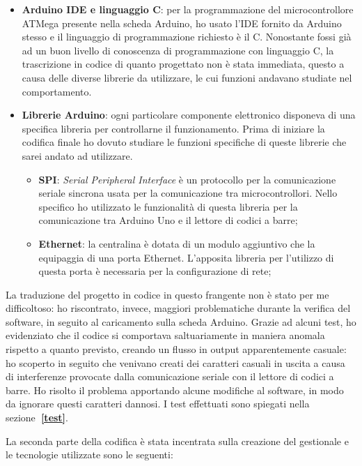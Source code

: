 \begin{itemize}
\item \textbf{Arduino IDE e linguaggio C}: per la programmazione del microcontrollore ATMega presente nella scheda Arduino, ho usato l'IDE fornito da Arduino stesso e il linguaggio di programmazione richiesto è il C. Nonostante fossi già ad un buon livello di conoscenza di programmazione con linguaggio C, la trascrizione in codice di quanto progettato non è stata immediata, questo a causa delle diverse librerie da utilizzare, le cui funzioni andavano studiate nel comportamento.
\item \textbf{Librerie Arduino}: ogni particolare componente elettronico disponeva di una specifica libreria per controllarne il funzionamento. Prima di iniziare la codifica finale ho dovuto studiare le funzioni specifiche di queste librerie che sarei andato ad utilizzare.
\begin{itemize}
	\item \textbf{SPI}: \textit{Serial Peripheral Interface} è un protocollo per la comunicazione seriale sincrona usata per la comunicazione tra microcontrollori. Nello specifico ho utilizzato le funzionalità di questa libreria per la comunicazione tra Arduino Uno e il lettore di codici a barre;
	\item \textbf{Ethernet}: la centralina è dotata di un modulo aggiuntivo che la equipaggia di una porta Ethernet. L'apposita libreria per l'utilizzo di questa porta è necessaria per la configurazione di rete;
	
\end{itemize}
\end{itemize}

La traduzione del progetto in codice in questo frangente non è stato per me difficoltoso: ho riscontrato, invece, maggiori problematiche durante la verifica del software, in seguito al caricamento sulla scheda Arduino. Grazie ad alcuni test, ho evidenziato che il codice si comportava saltuariamente in maniera anomala rispetto a quanto previsto, creando un flusso in output apparentemente casuale: ho scoperto in seguito che venivano creati dei caratteri casuali in uscita a causa di interferenze provocate dalla comunicazione seriale con il lettore di codici a barre. Ho risolto il problema apportando alcune modifiche al software, in modo da ignorare questi caratteri dannosi. I test effettuati sono spiegati nella sezione\textbf{~\ref{test}}.

\medskip

La seconda parte della codifica è stata incentrata sulla creazione del gestionale e le tecnologie utilizzate sono le seguenti:


